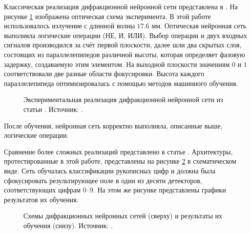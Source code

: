 \FloatBarrier\par
Классическая реализация дифракционной нейронной сети представлена в \cite{qian2020performing}. На рисунке \ref{ris:ClassicD2NN} изображена оптическая схема эксперимента. В этой работе использовалось излучение с длинной волны $17.6$ мм. Оптическая нейронная сеть выполняла логические операции (НЕ, И, ИЛИ). Выбор операции и двух входных сигналов производился за счёт первой плоскости, далее шли два скрытых слоя, состоящих из параллелепипедов различной высоты, которая определяет фазовую задержку, создаваемую этим элементом. На выходной плоскости значениям $0$ и $1$ соответствовали две разные области фокусировки. Высота каждого параллелепипеда оптимизировалась с помощью методов машинного обучения. 
\begin{figure}[h]
	\caption{Экспериментальная реализация дифракционной нейронной сети из статьи \cite{qian2020performing}. Источник: \cite{qian2020performing}.}
	\label{ris:ClassicD2NN}
\end{figure}
После обучения, нейронная сеть корректно выполняла, описанные выше, логические операции.

\FloatBarrier\par
Сравнение более сложных реализаций представлено в статье \cite{yan2019fourier}. Архитектуры, протестированные в этой работе, представлены на рисунке \ref{ris:FD2NN} в схематическом виде. Сеть обучалась классификации рукописных цифр и должна была сфокусировать результирующее поле в один из десяти детекторов, соответствующих цифрам $0$--$9$. На этом же рисунке представлены графики результатов их обучения.
\begin{figure}[h]
	\caption{Схемы дифракционных нейронных сетей (сверху) и результаты их обучения (снизу). Источник: \cite{yan2019fourier}.}
	\label{ris:FD2NN}
\end{figure}







